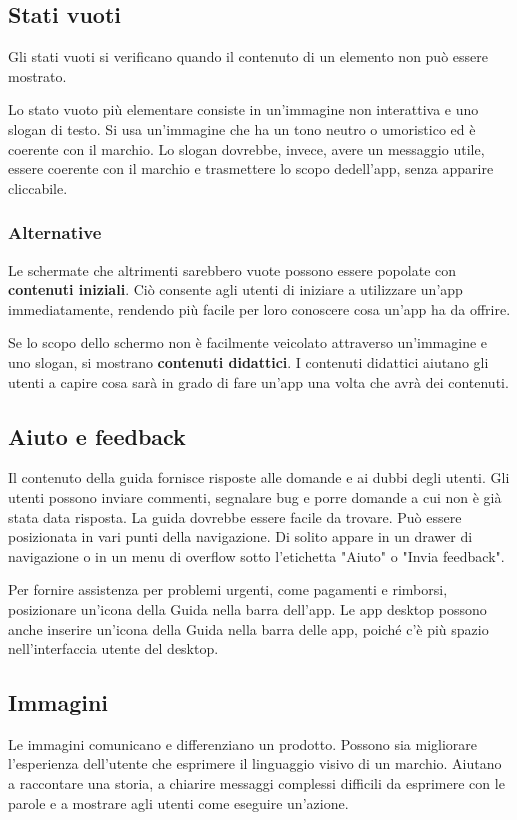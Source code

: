 \documentclass[12pt, a4paper]{report}
\begin{document}
	\subsection{Stati vuoti}
	Gli stati vuoti si verificano quando il contenuto di un elemento non può essere mostrato.

	Lo stato vuoto più elementare consiste in un'immagine non interattiva e uno slogan di testo. Si usa un'immagine che ha un tono neutro o umoristico ed è coerente con il marchio. Lo slogan dovrebbe, invece, avere un messaggio utile, essere coerente con il  marchio e trasmettere lo scopo dedell’app, senza apparire cliccabile.

	\subsubsection{Alternative}
	Le schermate che altrimenti sarebbero vuote possono essere popolate con \textbf{contenuti iniziali}. Ciò consente agli utenti di iniziare a utilizzare un'app immediatamente, rendendo più facile per loro conoscere cosa un'app ha da offrire.

	Se lo scopo dello schermo non è facilmente veicolato attraverso un'immagine e uno slogan, si mostrano \textbf{contenuti didattici}. I contenuti didattici aiutano gli utenti a capire cosa sarà in grado di fare un'app una volta che avrà dei contenuti.


	\subsection{Aiuto e feedback}
	Il contenuto della guida fornisce risposte alle domande e ai dubbi degli utenti. Gli utenti possono inviare commenti, segnalare bug e porre domande a cui non è già stata data risposta. La guida dovrebbe essere facile da trovare. Può essere posizionata in vari punti della navigazione.
	Di solito appare in un drawer di navigazione o in un menu di overflow sotto l'etichetta "Aiuto" o "Invia feedback".

	Per fornire assistenza per problemi urgenti, come pagamenti e rimborsi, posizionare un'icona della Guida nella barra dell'app. Le app desktop possono anche inserire un'icona della Guida nella barra delle app, poiché c'è più spazio nell'interfaccia utente del desktop.

	\subsection{Immagini}
	Le immagini comunicano e differenziano un prodotto. Possono sia migliorare l'esperienza dell'utente che esprimere il linguaggio visivo di un marchio. Aiutano a raccontare una storia, a chiarire messaggi complessi difficili da esprimere con le parole e a mostrare
	agli utenti come eseguire un'azione.
\end{document}
